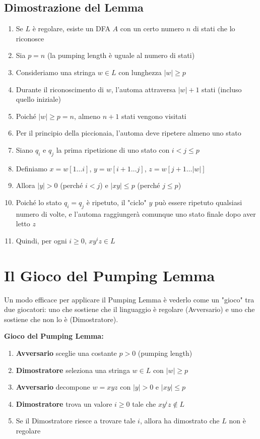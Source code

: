 \documentclass[12pt,a4paper]{article}
\begin{document}
\subsection{Dimostrazione del Lemma}

\begin{risoluzione}
\begin{enumerate}
    \item Se $L$ è regolare, esiste un DFA $A$ con un certo numero $n$ di stati che lo riconosce
    \item Sia $p = n$ (la pumping length è uguale al numero di stati)
    \item Consideriamo una stringa $w \in L$ con lunghezza $|w| \geq p$
    \item Durante il riconoscimento di $w$, l'automa attraversa $|w|+1$ stati (incluso quello iniziale)
    \item Poiché $|w| \geq p = n$, almeno $n+1$ stati vengono visitati
    \item Per il principio della piccionaia, l'automa deve ripetere almeno uno stato
    \item Siano $q_i$ e $q_j$ la prima ripetizione di uno stato con $i < j \leq p$
    \item Definiamo $x = w[1 \ldots i]$, $y = w[i+1 \ldots j]$, $z = w[j+1 \ldots |w|]$
    \item Allora $|y| > 0$ (perché $i < j$) e $|xy| \leq p$ (perché $j \leq p$)
    \item Poiché lo stato $q_i = q_j$ è ripetuto, il "ciclo" $y$ può essere ripetuto qualsiasi numero di volte, e l'automa raggiungerà comunque uno stato finale dopo aver letto $z$
    \item Quindi, per ogni $i \geq 0$, $xy^iz \in L$
\end{enumerate}
\end{risoluzione}

\section{Il Gioco del Pumping Lemma}

Un modo efficace per applicare il Pumping Lemma è vederlo come un "gioco" tra due giocatori: uno che sostiene che il linguaggio è regolare (Avversario) e uno che sostiene che non lo è (Dimostratore).

\begin{concettochiave}
\textbf{Gioco del Pumping Lemma:}
\begin{enumerate}
    \item \textbf{Avversario} sceglie una costante $p > 0$ (pumping length)
    \item \textbf{Dimostratore} seleziona una stringa $w \in L$ con $|w| \geq p$
    \item \textbf{Avversario} decompone $w = xyz$ con $|y| > 0$ e $|xy| \leq p$
    \item \textbf{Dimostratore} trova un valore $i \geq 0$ tale che $xy^iz \not\in L$
    \item Se il Dimostratore riesce a trovare tale $i$, allora ha dimostrato che $L$ non è regolare
\end{enumerate}
\end{concettochiave}
\end{document}
